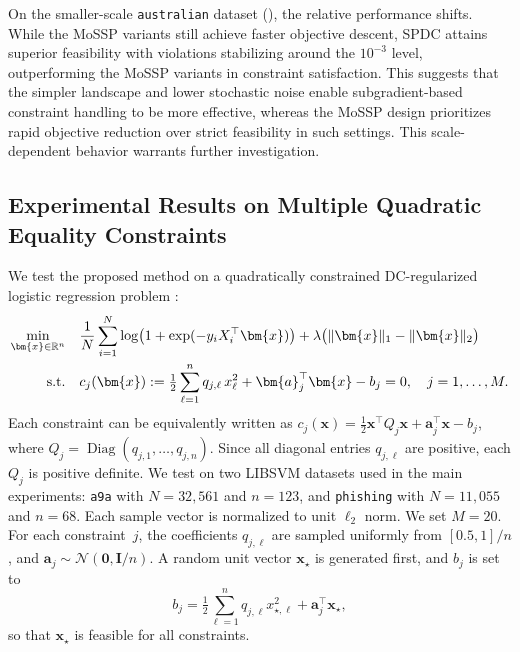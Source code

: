 \documentclass{article}
\theoremstyle{plain}
\theoremstyle{definition}
\theoremstyle{remark}
\newcommand{\zero}{\bm{0}}
\newcommand{\RR}{\mathbb{R}}
\newcommand{\bx}{\bm{x}}
\newcommand{\ba}{\bm{a}}
\DeclareMathOperator*{\Diag}{\mathrm{Diag}}
\newcommand{\bI}{\bm{I}}
\numberwithin{equation}{section}
\begin{document}
On the smaller-scale \texttt{australian} dataset (), the relative performance shifts. While the MoSSP variants still achieve faster objective descent, SPDC attains superior feasibility with violations stabilizing around the $10^{-3}$ level, outperforming the MoSSP variants in constraint satisfaction. This suggests that the simpler landscape and lower stochastic noise enable subgradient-based constraint handling to be more effective, whereas the MoSSP design prioritizes rapid objective reduction over strict feasibility in such settings. This scale-dependent behavior warrants further investigation.

\subsection{Experimental Results on Multiple Quadratic Equality Constraints}
\label{subsec:multiple_quadratic_equalities}
We test the proposed method on a quadratically constrained DC-regularized logistic regression problem
\cite{jin2022stochastic,shi2025momentum}:
\begin{align}
\label{eq:multiple_quadeq}
\min_{\bx \in \RR^n}\quad &
\frac{1}{N}\sum_{i=1}^{N}\log\bigl(1+\exp(-y_i X_i^\top \bx)\bigr)
    + \lambda\bigl(\|\bx\|_1-\|\bx\|_2\bigr) \notag \\
\mathrm{s.t.}\quad &
c_j(\bx):=\tfrac{1}{2}\sum_{\ell=1}^{n}q_{j,\ell}\,
x_\ell^2+\ba_j^\top \bx-b_j=0,
\quad j=1,\ldots,M.
\end{align}
Each constraint can be equivalently written as
\(c_j(\bx)=\tfrac{1}{2}\bx^\top Q_j\bx+\ba_j^\top\bx-b_j\), where
\(Q_j=\Diag(q_{j,1},\ldots,q_{j,n})\). Since all diagonal entries
\(q_{j,\ell}\) are positive, each \(Q_j\) is positive definite. 
We test on two LIBSVM datasets used in the main experiments:
\texttt{a9a} with \(N=32{,}561\) and \(n=123\), and
\texttt{phishing} with \(N=11{,}055\) and \(n=68\). Each sample vector is
normalized to unit \(\ell_2\) norm. We set \(M=20\). For each
constraint~\(j\), the coefficients \(q_{j,\ell}\) are sampled uniformly
from \([0.5,1]/n\), and
\(\ba_j \sim \mathcal{N}(\zero,\bI/n)\). A random unit vector
\(\bx_\star\) is generated first, and \(b_j\) is set to
\[
b_j=\tfrac{1}{2}\sum_{\ell=1}^{n}q_{j,\ell}x_{\star,\ell}^{2}
+\ba_j^\top\bx_\star,
\]
so that \(\bx_\star\) is feasible for all constraints.
\end{document}
